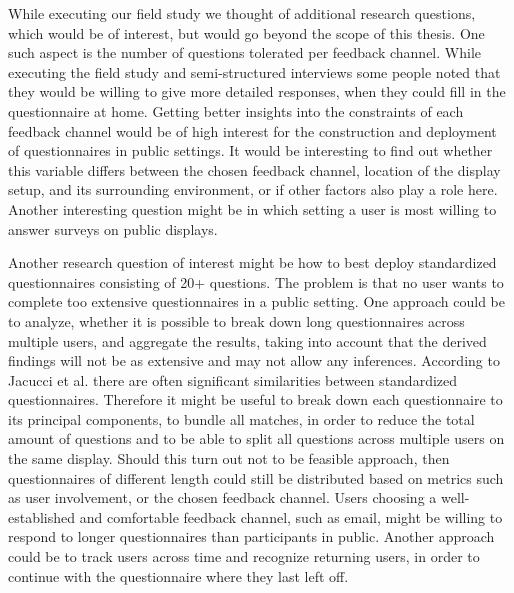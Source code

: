 While executing our field study we thought of additional research questions, which would be of interest, but would go beyond the scope of this thesis. 
One such aspect is the number of questions tolerated per feedback channel. While executing the field study and semi-structured interviews some people noted that they would be willing to give more detailed responses, when they could fill in the questionnaire at home. Getting better insights into the constraints of each feedback channel would be of high interest for the construction and deployment of questionnaires in public settings. It would be interesting to find out whether this variable differs between the chosen feedback channel, location of the display setup, and its surrounding environment, or if other factors also play a role here. Another interesting question might be in which setting a user is most willing to answer surveys on public displays. 


Another research question of interest might be how to best deploy standardized questionnaires consisting of 20+ questions. The problem is that no user wants to complete too extensive questionnaires in a public setting. One approach could be to analyze, whether it is possible to break down long questionnaires across multiple users, and aggregate the results, taking into account that the derived findings will not be as extensive and may not allow any inferences. According to Jacucci et al. \cite{jacucci2010worldsofinformation} there are often significant similarities between standardized questionnaires. Therefore it might be useful to break down each questionnaire to its principal components, to bundle all matches, in order to reduce the total amount of questions and to be able to split all questions across multiple users on the same display. 
Should this turn out not to be feasible approach, then questionnaires of different length could still be distributed based on metrics such as user involvement, or the chosen feedback channel. Users choosing a well-established and comfortable feedback channel, such as email, might be willing to respond to longer questionnaires than participants in public. Another approach could be to track users across time and recognize returning users, in order to continue with the questionnaire where they last left off.


